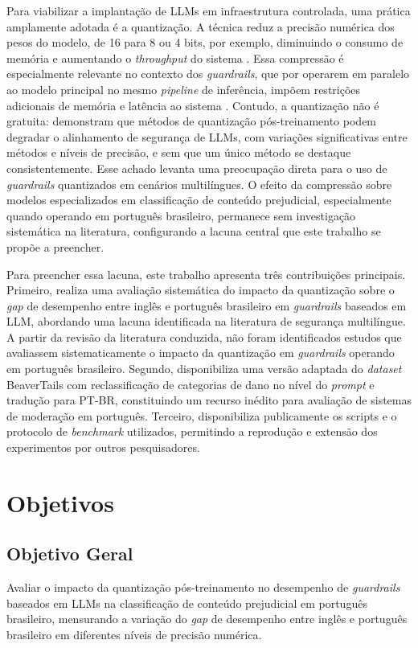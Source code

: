Para viabilizar a implantação de LLMs em infraestrutura controlada, uma prática amplamente adotada é a quantização. A técnica reduz a precisão numérica dos pesos do modelo, de 16 para 8 ou 4 bits, por exemplo, diminuindo o consumo de memória e aumentando o \textit{throughput} do sistema \cite{lin2024awq, frantar2023gptq}. Essa compressão é especialmente relevante no contexto dos \textit{guardrails}, que por operarem em paralelo ao modelo principal no mesmo \textit{pipeline} de inferência, impõem restrições adicionais de memória e latência ao sistema \cite{kumar2025freelunchguardrails}. Contudo, a quantização não é gratuita:  demonstram que métodos de quantização pós-treinamento podem degradar o alinhamento de segurança de LLMs, com variações significativas entre métodos e níveis de precisão, e sem que um único método se destaque consistentemente. Esse achado levanta uma preocupação direta para o uso de \textit{guardrails} quantizados em cenários multilíngues. O efeito da compressão sobre modelos especializados em classificação de conteúdo prejudicial, especialmente quando operando em português brasileiro, permanece sem investigação sistemática na literatura, configurando a lacuna central que este trabalho se propõe a preencher.

Para preencher essa lacuna, este trabalho apresenta três contribuições principais. Primeiro, realiza uma avaliação sistemática do impacto da quantização sobre o \textit{gap} de desempenho entre inglês e português brasileiro em \textit{guardrails} baseados em LLM, abordando uma lacuna identificada na literatura de segurança multilíngue. A partir da revisão da literatura conduzida, não foram identificados estudos que avaliassem sistematicamente o impacto da quantização em \textit{guardrails} operando em português brasileiro. Segundo, disponibiliza uma versão adaptada do \textit{dataset} BeaverTails com reclassificação de categorias de dano no nível do \textit{prompt} e tradução para PT-BR, constituindo um recurso inédito para avaliação de sistemas de moderação em português. Terceiro, disponibiliza publicamente os scripts e o protocolo de \textit{benchmark} utilizados, permitindo a reprodução e extensão dos experimentos por outros pesquisadores.

\section{Objetivos}
\label{sec:objetivos}

\subsection{Objetivo Geral}
\label{sec:objetivo-geral}
Avaliar o impacto da quantização pós-treinamento no desempenho de \textit{guardrails} baseados em LLMs na classificação de conteúdo prejudicial em português brasileiro, mensurando a variação do \textit{gap} de desempenho entre inglês e português brasileiro em diferentes níveis de precisão numérica.

